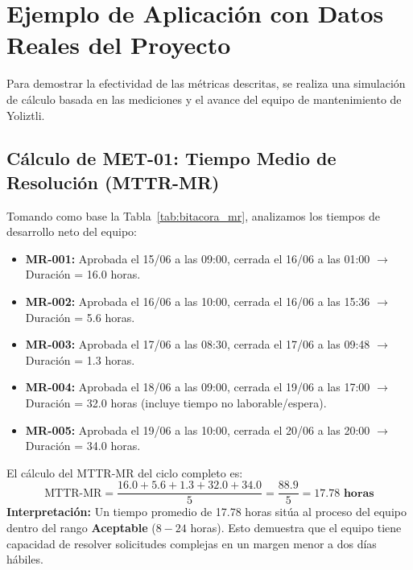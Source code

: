 \documentclass[12pt]{article}
\begin{document}
\section{Ejemplo de Aplicación con Datos Reales del Proyecto}

Para demostrar la efectividad de las métricas descritas, se realiza una simulación de cálculo basada en las mediciones y el avance del equipo de mantenimiento de Yoliztli.

\subsection{Cálculo de MET-01: Tiempo Medio de Resolución (MTTR-MR)}
Tomando como base la Tabla~\ref{tab:bitacora_mr}, analizamos los tiempos de desarrollo neto del equipo:
\begin{itemize}
    \item \textbf{MR-001:} Aprobada el 15/06 a las 09:00, cerrada el 16/06 a las 01:00 $\rightarrow$ Duración = 16.0 horas.
    \item \textbf{MR-002:} Aprobada el 16/06 a las 10:00, cerrada el 16/06 a las 15:36 $\rightarrow$ Duración = 5.6 horas.
    \item \textbf{MR-003:} Aprobada el 17/06 a las 08:30, cerrada el 17/06 a las 09:48 $\rightarrow$ Duración = 1.3 horas.
    \item \textbf{MR-004:} Aprobada el 18/06 a las 09:00, cerrada el 19/06 a las 17:00 $\rightarrow$ Duración = 32.0 horas (incluye tiempo no laborable/espera).
    \item \textbf{MR-005:} Aprobada el 19/06 a las 10:00, cerrada el 20/06 a las 20:00 $\rightarrow$ Duración = 34.0 horas.
\end{itemize}
El cálculo del MTTR-MR del ciclo completo es:
\begin{equation}
    \text{MTTR-MR} = \frac{16.0 + 5.6 + 1.3 + 32.0 + 34.0}{5} = \frac{88.9}{5} = \mathbf{17.78\text{ horas}}
\end{equation}
\textbf{Interpretación:} Un tiempo promedio de 17.78 horas sitúa al proceso del equipo dentro del rango \textcolor{value}{\textbf{Aceptable}} ($8 - 24$ horas). Esto demuestra que el equipo tiene capacidad de resolver solicitudes complejas en un margen menor a dos días hábiles.
\end{document}
